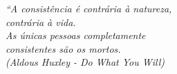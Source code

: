 \vspace*{\fill}
	\begin{flushright}
		\textit{``A consistência é contrária à natureza,
		\\ contrária à vida.
		\\ As únicas pessoas completamente 
		\\ consistentes são os mortos. 
		\\ (Aldous Huxley -  Do What You Will)}
	\end{flushright}
